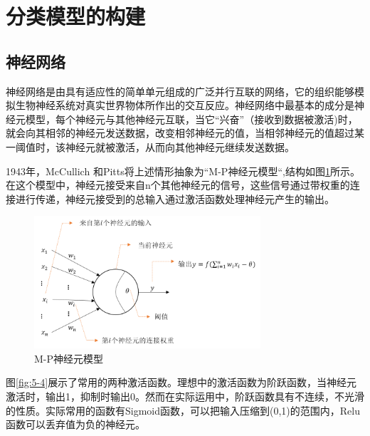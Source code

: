 \section{分类模型的构建}
\subsection{神经网络}
神经网络是由具有适应性的简单单元组成的广泛并行互联的网络，它的组织能够模拟生物神经系统对真实世界物体所作出的交互反应\cite{kohonen1988introduction}。神经网络中最基本的成分是神经元模型，每个神经元与其他神经元互联，当它“兴奋”（接收到数据被激活)时，就会向其相邻的神经元发送数据，改变相邻神经元的值，当相邻神经元的值超过某一阈值时，该神经元就被激活，从而向其他神经元继续发送数据。
\par 1943年，McCullich 和Pitts\cite{mcculloch1943logical}将上述情形抽象为“M-P神经元模型“,结构如图\ref{fig:5-3}所示。在这个模型中，神经元接受来自n个其他神经元的信号，这些信号通过带权重的连接进行传递，神经元接受到的总输入通过激活函数处理神经元产生的输出。
\begin{figure}[htbp]
	\begin{center}
		\includegraphics[width=0.75\textwidth]{figures/5-3}
		\caption{M-P神经元模型}
		\label{fig:5-3}
	\end{center}
\end{figure}
\par 图\ref{fig:5-4}展示了常用的两种激活函数。理想中的激活函数为阶跃函数，当神经元激活时，输出1，抑制时输出0。然而在实际运用中，阶跃函数具有不连续，不光滑的性质。实际常用的函数有Sigmoid函数，可以把输入压缩到(0,1)的范围内，Relu函数可以丢弃值为负的神经元。
